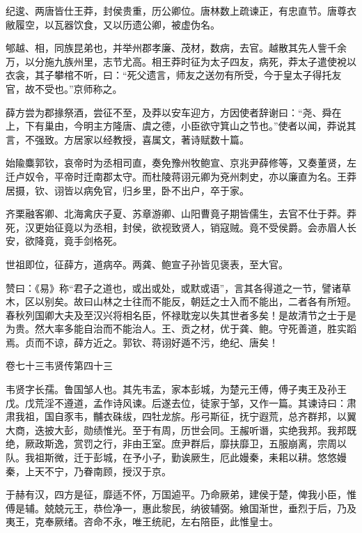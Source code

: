 \documentclass[12pt,UTF8]{ctexbook}
\begin{document}
纪逡、两唐皆仕王莽，封侯贵重，历公卿位。唐林数上疏谏正，有忠直节。唐尊衣敝履空，以瓦器饮食，又以历遗公卿，被虚伪名。



郇越、相，同族昆弟也，并举州郡孝廉、茂材，数病，去官。越散其先人訾千余万，以分施九族州里，志节尤高。相王莽时征为太子四友，病死，莽太子遣使裞以衣衾，其子攀棺不听，曰：“死父遗言，师友之送勿有所受，今于皇太子得托友官，故不受也。”京师称之。



薛方尝为郡掾祭酒，尝征不至，及莽以安车迎方，方因使者辞谢曰：“尧、舜在上，下有巢由，今明主方隆唐、虞之德，小臣欲守箕山之节也。”使者以闻，莽说其言，不强致。方居家以经教授，喜属文，著诗赋数十篇。



始隃麋郭钦，哀帝时为丞相司直，奏免豫州牧鲍宣、京兆尹薛修等，又奏董贤，左迁卢奴令，平帝时迁南郡太守。而杜陵蒋诩元卿为兗州刺史，亦以廉直为名。王莽居摄，钦、诩皆以病免官，归乡里，卧不出户，卒于家。



齐栗融客卿、北海禽庆子夏、苏章游卿、山阳曹竟子期皆儒生，去官不仕于莽。莽死，汉更始征竟以为丞相，封侯，欲视致贤人，销寇贼。竟不受侯爵。会赤眉人长安，欲降竟，竟手剑格死。



世祖即位，征薛方，道病卒。两龚、鲍宣子孙皆见褒表，至大官。



赞曰：《易》称“君子之道也，或出或处，或默或语”，言其各得道之一节，譬诸草木，区以别矣。故曰山林之士往而不能反，朝廷之士入而不能出，二者各有所短。春秋列国卿大夫及至汉兴将相名臣，怀禄耽宠以失其世者多矣！是故清节之士于是为贵。然大率多能自治而不能治人。王、贡之材，优于龚、鲍。守死善道，胜实蹈焉。贞而不谅，薛方近之。郭钦、蒋诩好遁不污，绝纪、唐矣！





卷七十三韦贤传第四十三



韦贤字长孺。鲁国邹人也。其先韦孟，家本彭城，为楚元王傅，傅子夷王及孙王戊。戊荒淫不遵道，孟作诗风谏。后遂去位，徒家于邹，又作一篇。其谏诗曰：肃肃我祖，国自豕韦，黼衣硃绂，四牡龙旂。彤弓斯征，抚宁遐荒，总齐群邦，以翼大商，迭披大彭，勋绩惟光。至于有周，历世会同。王赧听谮，实绝我邦。我邦既绝，厥政斯逸，赏罚之行，非由王室。庶尹群后，靡扶靡卫，五服崩离，宗周以队。我祖斯微，迁于彭城，在予小子，勤诶厥生，厄此嫚秦，耒耜以耕。悠悠嫚秦，上天不宁，乃眷南顾，授汉于京。



于赫有汉，四方是征，靡适不怀，万国逌平。乃命厥弟，建侯于楚，俾我小臣，惟傅是辅。兢兢元王，恭俭净一，惠此黎民，纳彼辅弼。飨国渐世，垂烈于后，乃及夷王，克奉厥绪。咨命不永，唯王统祀，左右陪臣，此惟皇士。
\end{document}
